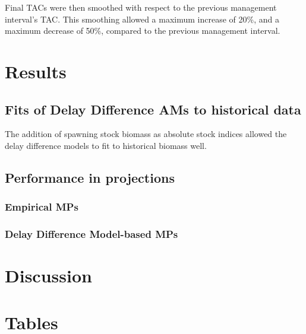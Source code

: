 \documentclass[]{article}
\begin{document}
Final TACs were then smoothed with respect to the previous management
interval's TAC. This smoothing allowed a maximum increase of 20\%, and
a maximum decrease of 50\%, compared to the previous management interval.

\hypertarget{results}{%
\section{Results}\label{results}}

\hypertarget{fits-of-delay-difference-ams-to-historical-data}{%
\subsection{Fits of Delay Difference AMs to historical data}\label{fits-of-delay-difference-ams-to-historical-data}}

The addition of spawning stock biomass as absolute stock indices allowed
the delay difference models to fit to historical biomass well.

\hypertarget{performance-in-projections}{%
\subsection{Performance in projections}\label{performance-in-projections}}

\hypertarget{empirical-mps}{%
\subsubsection{Empirical MPs}\label{empirical-mps}}

\hypertarget{delay-difference-model-based-mps}{%
\subsubsection{Delay Difference Model-based MPs}\label{delay-difference-model-based-mps}}

\hypertarget{discussion}{%
\section{Discussion}\label{discussion}}

\hypertarget{tables}{%
\section{Tables}\label{tables}}
\end{document}
